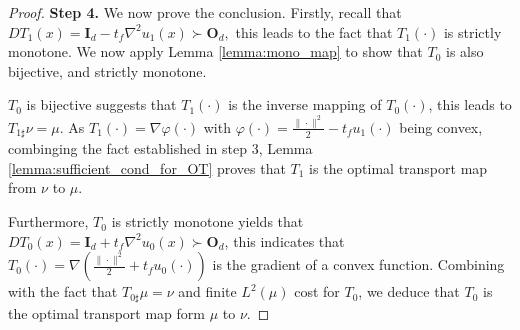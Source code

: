 \documentclass[10pt,a4paper]{amsart}
\begin{document}
\begin{proof}
\textbf{Step 4.} We now prove the conclusion. Firstly, recall that $D T_1(x) = \textbf{I}_d - t_f\nabla^2 u_1(x) \succ \textbf{O}_d,$ this leads to the fact that $T_1(\cdot)$ is strictly monotone. We now apply Lemma \ref{lemma:mono_map} to show that $T_0$ is also bijective, and strictly monotone. 

$T_0$ is bijective suggests that $T_1(\cdot)$ is the inverse mapping of $T_0(\cdot)$, this leads to $T_{1\sharp}\nu = \mu$. As $T_1(\cdot)=\nabla\varphi(\cdot)$ with $\varphi(\cdot) = \frac{\|\cdot\|^2}{2} - t_f u_1(\cdot)$ being convex, combinging the fact established in step 3, Lemma \ref{lemma:sufficient_cond_for_OT} proves that $T_1$ is the optimal transport map from $\nu$ to $\mu$. 

Furthermore, $T_0$ is strictly monotone yields that $DT_0(x) = \textbf{I}_d + t_f\nabla^2 u_0(x)\succ \textbf{O}_d$, this indicates that $T_0(\cdot)=\nabla\left(\frac{\|\cdot\|^2}{2} + t_f u_0(\cdot)\right)$ is the gradient of a convex function. Combining with the fact that $T_{0\sharp}\mu = \nu$ and finite $L^2(\mu)$ cost for $T_0$, we deduce that $T_0$ is the optimal transport map form $\mu$ to $\nu$.
\end{proof}
\end{document}
